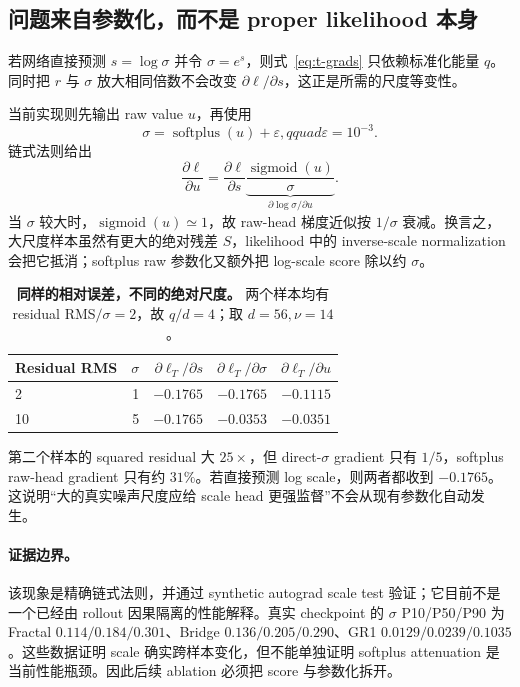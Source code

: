 \documentclass[10pt]{article}
\newcommand{\softplus}{\operatorname{softplus}}
\begin{document}
\subsection{问题来自参数化，而不是 proper likelihood 本身}

若网络直接预测 $s=\log\sigma$ 并令 $\sigma=e^s$，则式~\eqref{eq:t-grads} 只依赖标准化能量 $q$。同时把 $r$ 与 $\sigma$ 放大相同倍数不会改变 $\partial\ell/\partial s$，这正是所需的尺度等变性。

当前实现则先输出 raw value $u$，再使用
\begin{equation}
 \sigma=\softplus(u)+\varepsilon,qquad \varepsilon=10^{-3}.
\end{equation}
链式法则给出
\begin{equation}
 \frac{\partial\ell}{\partial u}
 =\frac{\partial\ell}{\partial s}
 \underbrace{\frac{\operatorname{sigmoid}(u)}{\sigma}}_{\partial\log\sigma/\partial u}.
 \label{eq:softplus-chain}
\end{equation}
当 $\sigma$ 较大时，$\operatorname{sigmoid}(u)\simeq1$，故 raw-head 梯度近似按 $1/\sigma$ 衰减。换言之，大尺度样本虽然有更大的绝对残差 $S$，likelihood 中的 inverse-scale normalization 会把它抵消；softplus raw 参数化又额外把 log-scale score 除以约 $\sigma$。

\begin{table}[h]
\centering
\caption{\textbf{同样的相对误差，不同的绝对尺度。} 两个样本均有 residual RMS$/\sigma=2$，故 $q/d=4$；取 $d=56,\nu=14$。}
\label{tab:scale-example}
\small
\begin{tabular}{@{}lrrrr@{}}
\toprule
Residual RMS & $\sigma$ & $\partial\ell_T/\partial s$ & $\partial\ell_T/\partial\sigma$ & $\partial\ell_T/\partial u$ \\
\midrule
2  & 1 & $-0.1765$ & $-0.1765$ & $-0.1115$ \\
10 & 5 & $-0.1765$ & $-0.0353$ & $-0.0351$ \\
\bottomrule
\end{tabular}
\end{table}

第二个样本的 squared residual 大 $25\times$，但 direct-$\sigma$ gradient 只有 $1/5$，softplus raw-head gradient 只有约 $31\%$。若直接预测 log scale，则两者都收到 $-0.1765$。这说明“大的真实噪声尺度应给 scale head 更强监督”不会从现有参数化自动发生。

\paragraph{证据边界。}
该现象是精确链式法则，并通过 synthetic autograd scale test 验证；它目前不是一个已经由 rollout 因果隔离的性能解释。真实 checkpoint 的 $\sigma$ P10/P50/P90 为 Fractal $0.114/0.184/0.301$、Bridge $0.136/0.205/0.290$、GR1 $0.0129/0.0239/0.1035$。这些数据证明 scale 确实跨样本变化，但不能单独证明 softplus attenuation 是当前性能瓶颈。因此后续 ablation 必须把 score 与参数化拆开。
\end{document}
